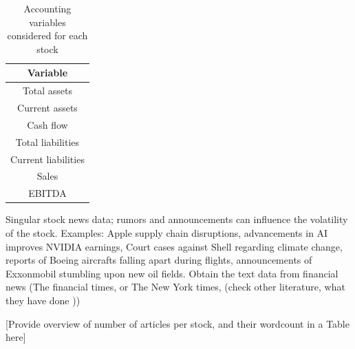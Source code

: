 \begin{table}[]
    \centering
    \begin{tabular}{c}
         \hline 
         Variable \\
         \hline
         Total assets \\
         Current assets \\
         Cash flow \\
         Total liabilities \\
         Current liabilities \\
         Sales \\
         EBITDA \\
         \hline
          
    \end{tabular}
    \caption{Accounting variables considered for each stock}
    \label{3_accounting variables}
\end{table}

Singular stock news data; rumors and announcements can influence the volatility of the stock. Examples: Apple supply chain disruptions, advancements in AI improves NVIDIA earnings, Court cases against Shell regarding climate change, reports of Boeing aircrafts falling apart during flights, announcements of Exxonmobil stumbling upon new oil fields. Obtain the text data from financial news (The financial times, or The New York times, (check other literature, what they have done ))

[Provide overview of number of articles per stock, and their wordcount in a Table here]
